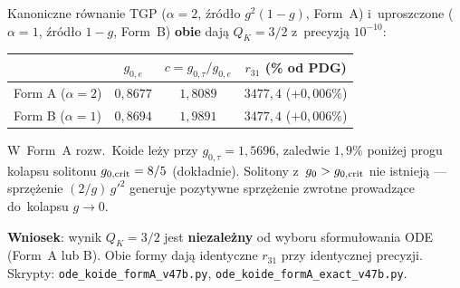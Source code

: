 \begin{remark}%
\label{rem:T-formA-vs-formB}
Kanoniczne r\'ownanie TGP ($\alpha = 2$, \'zr\'od\l{}o $g^2(1{-}g)$, Form~A)
i~uproszczone ($\alpha = 1$, \'zr\'od\l{}o $1{-}g$, Form~B) \textbf{obie} daj\k{a}
$Q_K = 3/2$ z~precyzj\k{a} $10^{-10}$:
\begin{center}\small
\begin{tabular}{lccc}
\toprule
  & $g_{0,e}$ & $c = g_{0,\tau}/g_{0,e}$ & $r_{31}$ (\% od PDG) \\
\midrule
Form A ($\alpha{=}2$) & $0{,}8677$ & $1{,}8089$ & $3477{,}4$ ($+0{,}006\%$) \\
Form B ($\alpha{=}1$) & $0{,}8694$ & $1{,}9891$ & $3477{,}4$ ($+0{,}006\%$) \\
\bottomrule
\end{tabular}
\end{center}
W~Form~A rozw.\ Koide le\.zy przy $g_{0,\tau} = 1{,}5696$, zaledwie $1{,}9\%$
poni\.zej progu kolapsu solitonu $g_{0,\rm crit} = 8/5$ (dok\l{}adnie).
Solitony z~$g_0 > g_{0,\rm crit}$ nie istniej\k{a} --- sprz\k{e}\.zenie
$(2/g)\,g'^2$ generuje pozytywne sprz\k{e}\.zenie zwrotne prowadz\k{a}ce
do~kolapsu $g \to 0$.

\textbf{Wniosek}: wynik $Q_K = 3/2$ jest \textbf{niezale\.zny} od wyboru
sformu\l{}owania ODE (Form~A lub B).  Obie formy daj\k{a} identyczne
$r_{31}$ przy identycznej precyzji.
Skrypty: \texttt{ode\_koide\_formA\_v47b.py}, \texttt{ode\_koide\_formA\_exact\_v47b.py}.
\end{remark}

